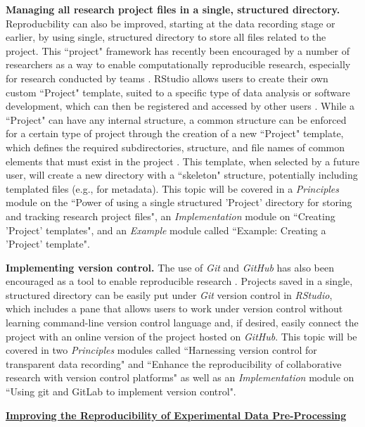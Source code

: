 \documentclass[pdftex,english,11pt,parskip=half]{scrartcl}
\begin{document}
\textbf{Managing all research project files in a single, structured directory.}
Reproducbility can also be improved, starting at the data recording stage or
earlier, by using single, structured directory to store all files related to the
project. This ``project" framework has recently been encouraged by a number of
researchers as a way to enable computationally reproducible research, especially
for research conducted by teams \cite{marwick2017packaging,
parker2017opinionated, lowndes2017our}. RStudio allows users to create their own
custom ``Project" template, suited to a specific type of data analysis or
software development, which can then be registered and accessed by other users
\cite{rstudioprojecttemplate}. While a ``Project" can have any internal
structure, a common structure can be enforced for a certain type of project
through the creation of a new ``Project" template, which defines the required
subdirectories, structure, and file names of common elements that must exist in
the project \cite{rstudioprojecttemplate}. This template, when selected by a
future user, will create a new directory with a ``skeleton" structure,
potentially including templated files (e.g., for metadata). This topic will be
covered in a \textit{Principles} module on the ``Power of using a single
structured 'Project' directory for storing and tracking research project files",
an \textit{Implementation} module on ``Creating 'Project' templates", and an
\textit{Example} module called ``Example: Creating a 'Project' template".

\textbf{Implementing version control.} The use of \textit{Git} and
\textit{GitHub} has also been encouraged as a tool to enable reproducible
research \cite{piccolo2016tools, ram2013git, bryan2017excuse, lowndes2017our,
cetinkaya2017infrastructure}. Projects saved in a single, structured directory
can be easily put under \textit{Git} version control in \textit{RStudio}, which
includes a pane that allows users to work under version control without learning
command-line version control language and, if desired, easily connect the
project with an online version of the project hosted on \textit{GitHub}.  This
topic will be covered in two \textit{Principles} modules called ``Harnessing
version control for transparent data recording" and ``Enhance the
reproducibility of collaborative research with version control platforms" as
well as an \textit{Implementation} module on ``Using git and GitLab to implement
version control".

\underline{\textbf{Improving the Reproducibility of Experimental Data
Pre-Processing}}
\end{document}
